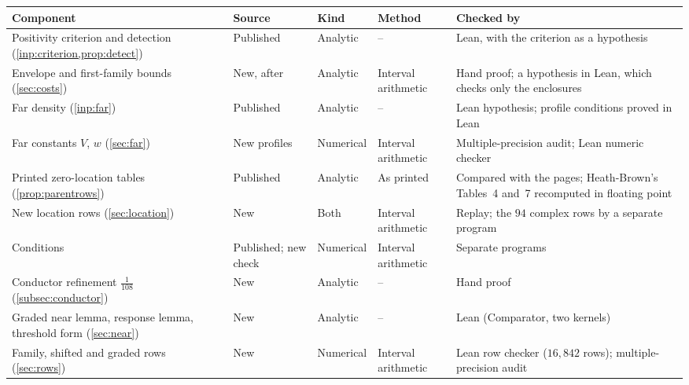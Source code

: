 \documentclass[11pt]{amsart}
\numberwithin{equation}{section}
\theoremstyle{plain}
\theoremstyle{definition}
\theoremstyle{remark}
\newcommand{\1}{\mathbf{1}}
\begin{document}
\begin{table}[tp]
\centering
\footnotesize
\setlength{\tabcolsep}{4pt}
\begin{tabular}{@{}>{\raggedright\arraybackslash}p{}
                >{\raggedright\arraybackslash}p{}
                >{\raggedright\arraybackslash}p{}
                >{\raggedright\arraybackslash}p{}
                >{\raggedright\arraybackslash}p{}@{}}
\toprule
Component & Source & Kind & Method & Checked by\\
\midrule
Positivity criterion and detection (\cref{inp:criterion,prop:detect}) &
  Published \cite{Xylouris2011nullstellen} & Analytic & -- &
  Lean, with the criterion as a hypothesis\\
Envelope and first-family bounds (\cref{sec:costs}) &
  New, after \cite{Xylouris2011nullstellen} & Analytic & Interval arithmetic &
  Hand proof; a hypothesis in Lean, which checks only the enclosures\\
Far density (\cref{inp:far}) &
  Published \cite{Xylouris2011nullstellen} & Analytic & -- &
  Lean hypothesis; profile conditions proved in Lean\\
Far constants $V$, $w$ (\cref{sec:far}) &
  New profiles & Numerical & Interval arithmetic &
  Multiple-precision audit; Lean numeric checker\\
Printed zero-location tables (\cref{prop:parentrows}) &
  Published \cite{HeathBrown1992zero,Xylouris2011nullstellen} & Analytic & As printed &
  Compared with the pages; Heath-Brown's Tables~4 and~7 recomputed in floating point\\
New location rows (\cref{sec:location}) &
  New & Both & Interval arithmetic &
  Replay; the $94$ complex rows by a separate program\\
Conditions \cite[(4.29), (4.34)]{Xylouris2011nullstellen} &
  Published; new check & Numerical & Interval arithmetic &
  Separate programs\\
Conductor refinement $\frac1{108}$ (\cref{subsec:conductor}) &
  New & Analytic & -- & Hand proof\\
Graded near lemma, response lemma, threshold form (\cref{sec:near}) &
  New & Analytic & -- & Lean (Comparator, two kernels)\\
Family, shifted and graded rows (\cref{sec:rows}) &
  New & Numerical & Interval arithmetic &
  Lean row checker ($16{,}842$ rows); multiple-precision audit\\

\end{tabular}
\end{table}
\end{document}
